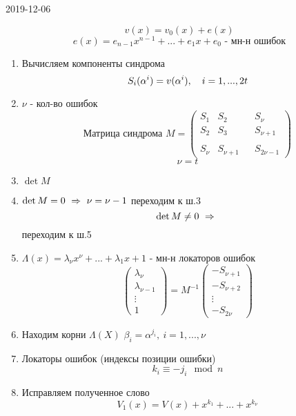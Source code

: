 \documentclass[12pt, fleqn]{article}
\begin{document}
\begin{lect}{2019-12-06}
    \begin{Definition}[Декодирование]
        \[v(x) = v_0(x) + e(x)\]
        \[e(x) = e_{n - 1}x^{n - 1} + ... + e_1x + e_0 \text{ - мн-н ошибок}  \]
        \begin{enumerate}
            \item Вычисляем компоненты синдрома
                \[S_i(\alpha^i) = v(\alpha^i), \quad i = 1, ..., 2t\]
            \item $\nu $ - кол-во ошибок
                \[\text{Матрица синдрома } M = \begin{pmatrix}
                    S_1 & S_2 & & S_\nu\\
                    S_2 & S_3 & & S_{\nu + 1}\\
                    \\
                    S_\nu & S_{\nu + 1} & & S_{2\nu - 1}  
                \end{pmatrix}\]
                \[\nu = t\]
            \item $\det M$
            \item $\det M = 0 \ \Rightarrow \ \nu = \nu - 1$ переходим к ш.3
                \[\det M \neq 0 \ \Ra  \ \] переходим к ш.5
            \item $\Lambda(x) = \lambda_\nu x^\nu + ... + \lambda_1x + 1$ - мн-н локаторов ошибок
                \[\begin{pmatrix}
                    \lambda_\nu\\
                    \lambda_{\nu - 1}\\
                    \vdots\\
                    1
                \end{pmatrix} = M^{-1} \begin{pmatrix}
                    -S_{\nu + 1}\\
                    -S_{\nu + 2}\\
                    \vdots\\
                    -S_{2\nu} 
                \end{pmatrix} \]
            \item Находим корни $\Lambda(X)$ \q $\beta_i = \alpha^{j_i}, \ i = 1, ..., \nu $
            \item Локаторы ошибок (индексы позиции ошибки)
                \[k_i \equiv -j_i  \mod n\]
            \item Исправляем полученное слово
                \[V_1(x) = V(x) + x^{k_1} + ... + x^{k_\nu}  \]
        \end{enumerate}
    \end{Definition}


\end{lect}
\end{document}
